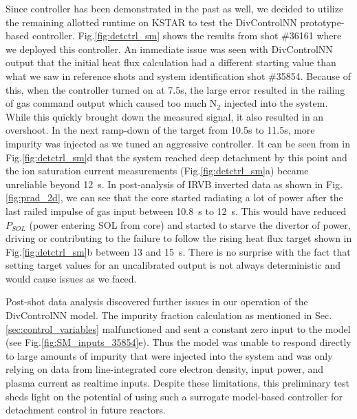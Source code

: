 Since \Afrac controller has been demonstrated in the past as well, we decided to utilize the remaining allotted runtime on KSTAR to test the DivControlNN prototype-based controller.
Fig.\ref{fig:detctrl_sm} shows the results from shot \#36161 where we deployed this controller.
An immediate issue was seen with DivControlNN output that the initial heat flux calculation had a different starting value than what we saw in reference shots and system identification shot \#35854.
Because of this, when the controller turned on at 7.5s, the large error resulted in the railing of gas command output which caused too much N$_2$ injected into the system.
While this quickly brought down the measured signal, it also resulted in an overshoot.
In the next ramp-down of the target from 10.5s to 11.5s, more impurity was injected as we tuned an aggressive controller.
It can be seen from \Afrac in Fig.\ref{fig:detctrl_sm}d that the system reached deep detachment by this point and the ion saturation current measurements (Fig.\ref{fig:detctrl_sm}a) became unreliable beyond 12~s.
In post-analysis of IRVB inverted data as shown in Fig.\ref{fig:prad_2d}, we can see that the core started radiating a lot of power after the last railed impulse of gas input between 10.8~s to 12~s.
This would have reduced $P_{SOL}$ (power entering SOL from core) and started to starve the divertor of power, driving or contributing to the failure to follow the rising heat flux target shown in Fig.\ref{fig:detctrl_sm}b between 13 and 15~s.
There is no surprise with the fact that setting target values for an uncalibrated output is not always deterministic and would cause issues as we faced.

Post-shot data analysis discovered further issues in our operation of the DivControlNN model.
The impurity fraction calculation as mentioned in Sec.\ref{sec:control_variables} malfunctioned and sent a constant zero input to the model (see Fig.\ref{fig:SM_inputs_35854}e).
Thus the model was unable to respond directly to large amounts of impurity that were injected into the system and was only relying on data from line-integrated core electron density, input power, and plasma current as realtime inputs.
Despite these limitations, this preliminary test sheds light on the potential of using such a surrogate model-based controller for detachment control in future reactors.

